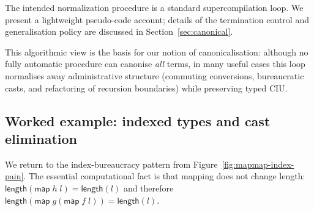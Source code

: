 The intended normalization procedure is a standard supercompilation loop.
We present a lightweight pseudo-code account; details of the termination control and generalisation policy are discussed in Section~\ref{sec:canonical}.

\begin{center}
\end{center}

This algorithmic view is the basis for our notion of canonicalisation: although no fully automatic procedure can canonise \emph{all} terms, in many useful cases this loop normalises away administrative structure (commuting conversions, bureaucratic casts, and refactoring of recursion boundaries) while preserving typed CIU.

\subsection{Worked example: indexed types and cast elimination}
\label{sec:index-example}

We return to the index-bureaucracy pattern from Figure~\ref{fig:mapmap-index-pain}.
The essential computational fact is that mapping does not change length:
\(
  \mathsf{length}(\mathsf{map}\;h\;l) = \mathsf{length}(l)
\)
and therefore
\(
  \mathsf{length}(\mathsf{map}\;g(\mathsf{map}\;f\;l)) = \mathsf{length}(l).
\)

